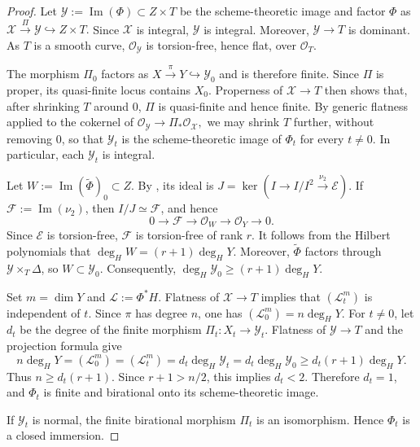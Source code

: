 \documentclass[11pt,twoside]{amsart}
\theoremstyle{plain}
\numberwithin{equation}{section}
\theoremstyle{definition}
\begin{document}
\begin{proof}
Let $\mathscr Y:=\operatorname{Im}(\Phi)\subset Z\times T$ be the scheme-theoretic image and factor $\Phi$ as
$
\mathscr X\xrightarrow{\Pi}\mathscr Y\hookrightarrow Z\times T.
$
Since $\mathscr X$ is integral, $\mathscr Y$ is integral. Moreover, $\mathscr Y\to T$ is dominant. As $T$ is a smooth curve, $\mathcal O_{\mathscr Y}$ is torsion-free, hence flat, over $\mathcal O_T$.

The morphism $\Pi_0$ factors as
$
X\xrightarrow{\pi}Y\hookrightarrow\mathscr Y_0
$
and is therefore finite. Since $\Pi$ is proper, its quasi-finite locus contains $X_0$. Properness of $\mathscr X\to T$ then shows that, after shrinking $T$ around $0$, $\Pi$ is quasi-finite and hence finite. By generic flatness applied to the cokernel of
$
\mathcal O_{\mathscr Y}\to\Pi_*\mathcal O_{\mathscr X},
$
we may shrink $T$ further, without removing $0$, so that $\mathscr Y_t$ is the scheme-theoretic image of $\Phi_t$ for every $t\neq0$. In particular, each $\mathscr Y_t$ is integral.

Let
$
W:=\operatorname{Im}(\widetilde\Phi)_0\subset Z.
$
By , its ideal is
$
J=\ker(I\to I/I^2\xrightarrow{\nu_2}\mathcal E).
$
If $\mathcal F:=\operatorname{Im}(\nu_2)$, then $I/J\simeq\mathcal F$, and hence
$$
0\longrightarrow\mathcal F
\longrightarrow\mathcal O_W
\longrightarrow\mathcal O_Y
\longrightarrow0.
$$
Since $\mathcal E$ is torsion-free, $\mathcal F$ is torsion-free of rank $r$. It follows from the Hilbert polynomials that
$
\deg_H W=(r+1)\deg_HY.
$
Moreover, $\widetilde\Phi$ factors through $\mathscr Y\times_T\Delta$, so $W\subset\mathscr Y_0$. Consequently,
$
\deg_H\mathscr Y_0\geq(r+1)\deg_HY.
$

Set $m=\dim Y$ and $\mathscr L:=\Phi^*H$. Flatness of $\mathscr X\to T$ implies that $(\mathscr L_t^m)$ is independent of $t$. Since $\pi$ has degree $n$, one has $(\mathscr L_0^m)=n\deg_HY$. For $t\neq0$, let $d_t$ be the degree of the finite morphism $\Pi_t:X_t\to\mathscr Y_t$. Flatness of $\mathscr Y\to T$ and the projection formula give
$$
n\deg_HY
=(\mathscr L_0^m)
=(\mathscr L_t^m)
=d_t\deg_H\mathscr Y_t
=d_t\deg_H\mathscr Y_0
\geq d_t(r+1)\deg_HY.
$$
Thus $n\geq d_t(r+1)$. Since $r+1>n/2$, this implies $d_t<2$. Therefore $d_t=1$, and $\Phi_t$ is finite and birational onto its scheme-theoretic image.

If $\mathscr Y_t$ is normal, the finite birational morphism $\Pi_t$ is an isomorphism. Hence $\Phi_t$ is a closed immersion.
\end{proof}
\end{document}
